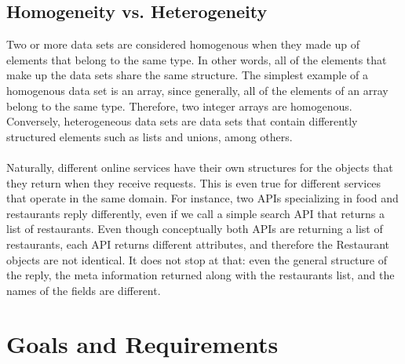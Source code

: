 \subsection{Homogeneity vs. Heterogeneity}
Two or more data sets are considered homogenous when they made up of elements that belong to the same type. In other words, all of the elements that make up the data sets share the same structure. The simplest example of a homogenous data set is an array, since generally, all of the elements of an array belong to the same type. Therefore, two integer arrays are homogenous. Conversely, heterogeneous data sets are data sets that contain differently structured elements such as lists and unions, among others.\\\\
Naturally, different online services have their own structures for the objects that they return when they receive requests. This is even true for different services that operate in the same domain. For instance, two APIs specializing in food and restaurants reply differently, even if we call a simple search API that returns a list of restaurants. Even though conceptually both APIs are returning a list of restaurants, each API returns different attributes, and therefore the Restaurant objects are not identical. It does not stop at that: even the general structure of the reply, the meta information returned along with the restaurants list, and the names of the fields are different.

\section{Goals and Requirements}

